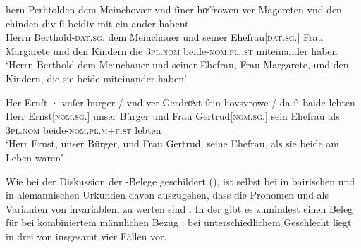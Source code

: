 \begin{exe}
\ex \label{ex:m+f_si_beide_iu}
	\begin{xlist}
	\ex \label{ex:m+f_si_beidiu}
		\gll hern Perhtolden dem Meinchovær vnd ſiner hoͮſfrowen ver Magereten
				vnd den chinden div ſi beidiv {mit ein ander} habent \\
			Herrn Berthold-\textsc{dat.sg.\MascM} dem Meinchauer und seiner
				Ehefrau[\textsc{dat.sg.\FemF}] Frau Margarete und den Kindern
				die \textsc{3pl\subMF.nom} beide-\textsc{nom.pl.\NeutMF.st}
				miteinander haben \\
		\trans `Herrn Berthold dem Meinchauer und seiner Ehefrau, Frau
			Margarete, und den Kindern, die sie beide miteinander haben'
			\parencites(Nr.~937, Regensburg, 1287)[292,40--41]{cao2}

	\ex \label{ex:m+f_si_beide}
		\gll Her Ernſt · vnſer burger / vnd ver Gerdroͤvt ſein hovsvrowe / da
				ſi baide lebten \\
			Herr Ernst[\textsc{nom.sg.\MascM}] {} unser Bürger {} und Frau
				Gertrud[\textsc{nom.sg.\FemF}] sein Ehefrau {} als
				\textsc{3pl\subMF.nom} beide-\textsc{nom.pl.m+f\subMF.st}
				lebten \\
		\trans `Herr Ernst, unser Bürger, und Frau Gertrud, seine Ehefrau,
			als sie beide am Leben waren'
			\parencites(Nr.~1073, Wien, 1289)[374,40--41]{cao2}
	\end{xlist}
\end{exe}

Wie bei der Diskussion der \CAO{}-Belege geschildert
(), ist selbst bei
 in bairischen und 
in alemannischen Urkunden davon auszugehen, dass
die Pronomen  und  als Varianten von invariablem 
zu werten sind \autocite[vgl.][394--396]{ksw2}. In der \KC{} gibt es zumindest
einen Beleg für  bei kombiniertem männlichen Bezug
; bei unterschiedlichem Geschlecht liegt
 in drei von insgesamt vier Fällen vor.

